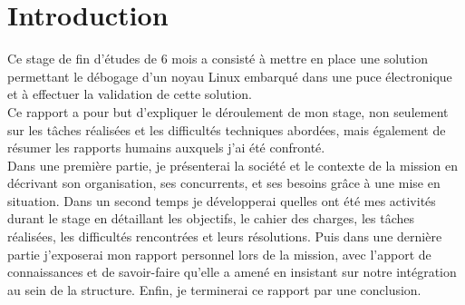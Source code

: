 
\chapter*{Introduction}
\label{chp:intro}

Ce stage de fin d'études de 6 mois a consisté à mettre en place une solution
permettant le débogage d'un noyau Linux embarqué dans une puce électronique
et à effectuer la validation de cette solution. \\

Ce rapport a pour but d’expliquer le déroulement de mon stage, non seulement
sur les tâches réalisées et les difficultés techniques abordées, mais
également de résumer les rapports humains auxquels j’ai été confronté. \\

Dans une première partie, je présenterai la société et le contexte de la
mission en décrivant son organisation, ses concurrents, et ses besoins grâce à
une mise en situation.  Dans un second temps je développerai quelles ont été
mes activités durant le stage en détaillant les objectifs, le cahier des
charges, les tâches réalisées, les difficultés rencontrées et leurs
résolutions.  Puis dans une dernière partie j’exposerai mon rapport personnel
lors de la mission, avec l’apport de connaissances et de savoir-faire qu’elle
a amené en insistant sur notre intégration au sein de la structure.  Enfin, je
terminerai ce rapport par une conclusion. \\

